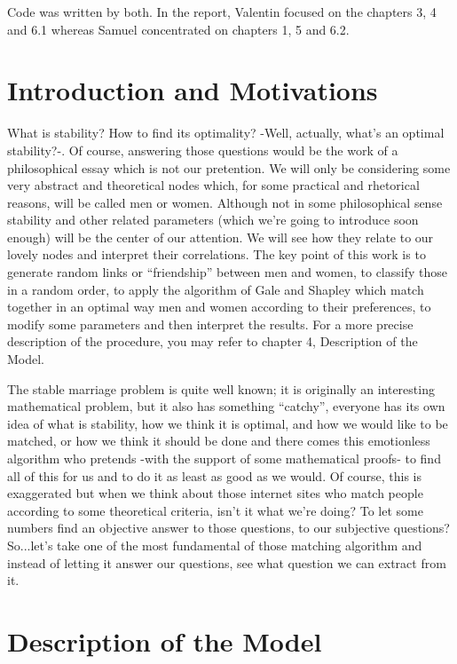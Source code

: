 \documentclass[11pt]{article}
\begin{document}
Code was written by both. In the report, Valentin focused on the chapters 3, 4 and 6.1 whereas Samuel concentrated on chapters 1, 5 and 6.2.

\section{Introduction and Motivations}

What is stability? How to find its optimality? -Well, actually, what’s an optimal stability?-. Of 
course, answering those questions would be the work of a philosophical essay which is not our 
pretention. We will only be considering some very abstract and theoretical nodes which, for some 
practical and rhetorical reasons, will be called men or women.
Although not in some philosophical sense stability and other related parameters (which we’re going 
to introduce soon enough) will be the center of our attention. We will see how they relate to our 
lovely nodes and interpret their correlations. The key point of this work is to generate random links 
or “friendship” between men and women, to classify those in a random order, to apply the algorithm 
of Gale and Shapley which match together in an optimal way men and women according to their 
preferences, to modify some parameters and then interpret the results. For a more precise 
description of the procedure, you may refer to chapter 4, Description of the Model.

The stable marriage problem is quite well known; it is originally an interesting mathematical 
problem, but it also has something “catchy”, everyone has its own idea of what is stability, how we 
think it is optimal, and how we would like to be matched, or how we think it should be done and 
there comes this emotionless algorithm who pretends -with the support of some mathematical 
proofs- to find all of this for us and to do it as least as good as we would. Of course, this is 
exaggerated but when we think about those internet sites who match people according to some 
theoretical criteria, isn’t it what we’re doing? To let some numbers find an objective answer to those 
questions, to our subjective questions? So...let’s take one of the most fundamental of those matching 
algorithm and instead of letting it answer our questions, see what question we can extract from it.

\section{Description of the Model}
\end{document}
